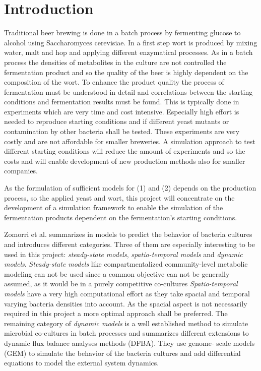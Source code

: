 \section{Introduction}\label{sec:introduction}

Traditional beer brewing is done in a batch process by fermenting glucose to alcohol using
Saccharomyces cerevisiae. In a first step wort is produced by mixing water, malt and hop and
applying different enzymatical processes. As in a batch process the densities of metabolites
in the culture are not controlled the fermentation product and so the quality of the beer is
highly dependent on the composition of the wort. To enhance the product quality the process
of fermentation must be understood in detail and correlations between the starting conditions
and fermentation results must be found. This is typically done in experiments which are very
time and cost intensive. Especially high effort is needed to reproduce starting conditions and if
different yeast mutants or contamination by other bacteria shall be tested. These experiments
are very costly and are not affordable for smaller breweries. A simulation approach to test
different starting conditions will reduce the amount of experiments and so the costs and will
enable development of new production methods also for smaller companies.

As the formulation of sufficient models for (1) and (2)
depends on the production process, so the applied yeast and wort, this project will concentrate
on the development of a simulation framework to enable the simulation of the fermentation
products dependent on the fermentation’s starting conditions.


Zomorri et al. summarizes in \cite{zomorrodi_synthetic_2016} models to predict the behavior of bacteria cultures and introduces
different categories. Three of them are especially
interesting to be used in this project: \textit{steady-state models}, \textit{spatio-temporal models} and \textit{dynamic models}.
\textit{Steady-state models} like compartmentalized community-level metabolic modeling can not be used
since a common objective can not be generally assumed, as it would be in a purely competitive co-cultures
\textit{Spatio-temporal models} have a very high computational effort as they take spacial and temporal varying bacteria densities
into account. As the spacial aspect is not necessarily required in this project a more optimal approach shall be preferred.
The remaining category of \textit{dynamic models} is a well established method to simulate microbial co-cultures in batch processes
and summarizes different extensions to dynamic flux balance analyses methods (DFBA)\cite{zomorrodi_synthetic_2016}. They use genome-
scale models (GEM) to simulate the behavior of the bacteria cultures and add differential equations to model the external system dynamics.

